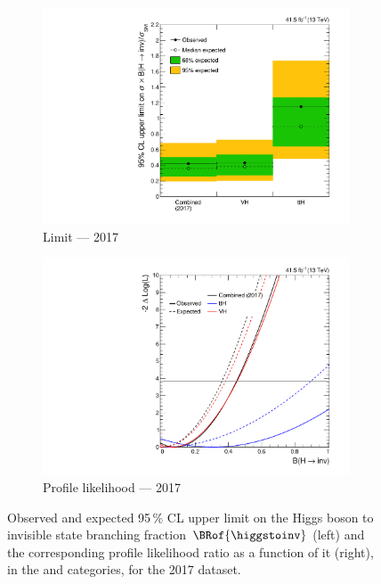 \begin{figure}[htbp]
    \centering
    \begin{subfigure}[t]{0.45\textwidth}
        \includegraphics[width=\textwidth]{chapters/higgstoinv/figures/limits/per_year/limit_2017_comb.pdf}
        \caption{Limit --- 2017}
    \end{subfigure}
    \hspace{0.05\textwidth}
    \begin{subfigure}[t]{0.45\textwidth}
        \includegraphics[width=\textwidth]{chapters/higgstoinv/figures/likelihood_scan/profile_likelihood_scan_2017.pdf}
        \caption{Profile likelihood --- 2017}
    \end{subfigure}
    \caption[Observed and expected 95\,\% CL upper limit on the Higgs boson to invisible state branching fraction $\BRof{\higgstoinv}$ and the corresponding profile likelihood ratio as a function of it, in the \ttH and \VH categories, for the 2017 dataset]{Observed and expected 95\,\% CL upper limit on the Higgs boson to invisible state branching fraction $\BRof{\higgstoinv}$ (left) and the corresponding profile likelihood ratio as a function of it (right), in the \ttH and \VH categories, for the 2017 dataset.}
    \label{fig:htoinv_limit_likelihood_2017}
\end{figure}

